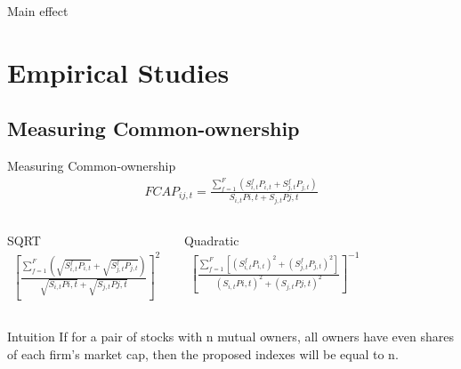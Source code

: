 \documentclass{beamer}
\begin{document}
\begin{frame}{Main effect}
{
}
		
		\hfill
		\hyperlink{maineffect}{}
	\end{frame}
	
	\section{Empirical Studies}
	\subsection{Measuring Common-ownership}
	
	
	\begin{frame}{Measuring Common-ownership}\label{Intuition}
		\cite{AntonPolk}
		\begin{align*}
			\boxed{FCAP_{ij,t} = \frac{\sum_{f = 1}^{F} (S^f_{i,t}P_{i,t}+S^f_{j,t}P_{j,t})}{S_{i,t}P{i,t} + S_{j,t}P{j,t}}}
		\end{align*}
	\pause
		\begin{columns}
			\centering
			SQRT
			\begin{align*}
				\boxed{              [\frac{\sum_{f =1}^{F}(\sqrt{S^f_{i,t}P_{i,t}}+\sqrt{S^f_{j,t}P_{j,t}})}{\sqrt{S_{i,t}P{i,t}} + \sqrt{S_{j,t}P{j,t}}}]^2 }
			\end{align*}     
		             
			\centering  
			Quadratic
			\begin{align*}
				\boxed{    [{\frac{\sum_{f = 1}^{F}[(S^f_{i,t}P_{i,t})^2+(S^f_{j,t}P_{j,t})^2]}{(S_{i,t}P{i,t})^2 + (S_{j,t}P{j,t})^2}}]^{-1}}
			\end{align*}
		\end{columns}
	\pause
		\begin{block}{Intuition}
			If for a pair of stocks with n mutual owners, all owners have even shares of each firm's market cap, then the proposed indexes will be equal to n.
			\hyperlink{Proof}{}
		\end{block}
		
	\end{frame}
	
\end{document}
